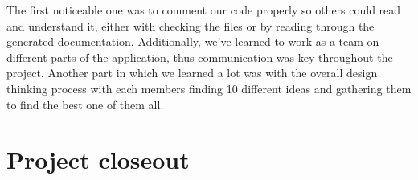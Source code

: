 \documentclass{sigchi}
\begin{document}
The first noticeable one was to comment our code properly so others could read and understand it, either with checking the files or by reading through the generated documentation. Additionally, we've learned to work as a team on different parts of the application, thus communication was key throughout the project.
Another part in which we learned a lot was with the overall design thinking process with each members finding 10 different ideas and gathering them to find the best one of them all.

\section{Project closeout}

%
%
%
%
%
\end{document}
